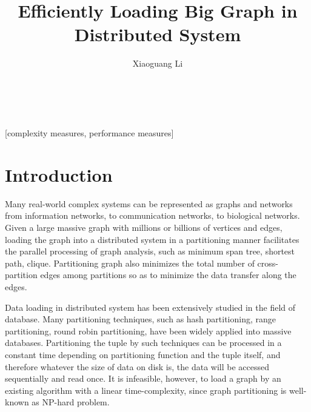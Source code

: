 \documentclass{sig-alternate-2013}
\begin{document}
\title{Efficiently Loading Big Graph in Distributed System
}

\author{
\alignauthor
Xiaoguang Li\\
       \\
       \\
}

\maketitle

\begin{abstract}

\end{abstract}

[complexity measures, performance measures]



\section{Introduction}
Many real-world complex systems can be represented as graphs and networks from information networks, to communication networks, to biological networks. Given a large massive graph with millions or billions of vertices and edges, loading the graph into a distributed system in a partitioning manner facilitates the parallel processing of graph analysis, such as minimum span tree, shortest path, clique. Partitioning graph also minimizes the total number of cross-partition edges among partitions so as to minimize the data transfer along the edges.

Data loading in distributed system has been extensively studied in the field of database. Many partitioning techniques, such as hash partitioning, range partitioning, round robin partitioning, have been widely applied into massive databases. Partitioning the tuple by such techniques can be processed in a constant time depending on partitioning function and the tuple itself, and therefore whatever the size of data on disk is, the data will be accessed sequentially and read once. It is infeasible, however, to load a graph by an existing algorithm with a linear time-complexity, since graph partitioning is well-known as NP-hard problem.
\end{document}
